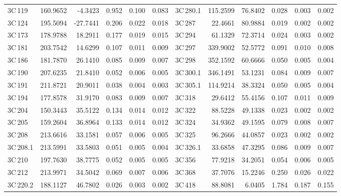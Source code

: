 \documentclass[mathleft,fleqn,%
]{an}
\begin{document}
\begin{table*}
\begin{tabular}{lrrrrr|lrrrrr}
3C\,119      &   160.9652 &    -4.3423 & 0.952    & 0.100  & 0.083  &  3C\,280.1    &   115.2599 &    76.8402 &  0.028   & 0.003  & 0.002   \\
3C\,124      &   195.5094 &   -27.7441 & 0.206    & 0.022  & 0.018  &  3C\,287      &    22.4661 &    80.9884 &  0.019   & 0.002  & 0.002   \\
3C\,173      &   178.9788 &    18.2911 & 0.177    & 0.019  & 0.015  &  3C\,294      &    61.1329 &    72.3714 &  0.024   & 0.003  & 0.002   \\
3C\,181      &   203.7542 &    14.6299 & 0.107    & 0.011  & 0.009  &  3C\,297      &   339.9002 &    52.5772 &  0.091   & 0.010  & 0.008   \\
3C\,186      &   181.7870 &    26.1410 & 0.085    & 0.009  & 0.007  &  3C\,298      &   352.1592 &    60.6666 &  0.050   & 0.005  & 0.004   \\
3C\,190      &   207.6235 &    21.8410 & 0.052    & 0.006  & 0.005  &  3C\,300.1    &   346.1491 &    53.1231 &  0.084   & 0.009  & 0.007   \\
3C\,191      &   211.8721 &    20.9011 & 0.038    & 0.004  & 0.003  &  3C\,305.1    &   114.9214 &    38.3324 &  0.050   & 0.005  & 0.004   \\
3C\,194      &   177.8578 &    31.9170 & 0.083    & 0.009  & 0.007  &  3C\,318      &    29.6412 &    55.4156 &  0.107   & 0.011  & 0.009   \\
3C\,204      &   150.3443 &    35.5122 & 0.134    & 0.014  & 0.012  &  3C\,322      &    88.5228 &    49.1338 &  0.023   & 0.002  & 0.002   \\
3C\,205      &   159.2604 &    36.8964 & 0.133    & 0.014  & 0.012  &  3C\,324      &    34.9362 &    49.1595 &  0.079   & 0.008  & 0.007   \\
3C\,208      &   213.6616 &    33.1581 & 0.057    & 0.006  & 0.005  &  3C\,325      &    96.2666 &    44.0857 &  0.023   & 0.002  & 0.002   \\
3C\,208.1    &   213.5991 &    33.5803 & 0.051    & 0.005  & 0.004  &  3C\,326.1    &    33.6858 &    47.3295 &  0.086   & 0.009  & 0.007   \\
3C\,210      &   197.7630 &    38.7775 & 0.052    & 0.005  & 0.005  &  3C\,356      &    77.9218 &    34.2051 &  0.054   & 0.006  & 0.005   \\
3C\,212      &   213.9971 &    34.5042 & 0.069    & 0.007  & 0.006  &  3C\,368      &    37.7076 &    15.2246 &  0.250   & 0.026  & 0.022   \\
3C\,220.2    &   188.1127 &    46.7802 & 0.026    & 0.003  & 0.002  &  3C\,418      &    88.8081 &     6.0405 &  1.784   & 0.187  & 0.155   \\

\end{tabular}
\end{table*}
\end{document}
